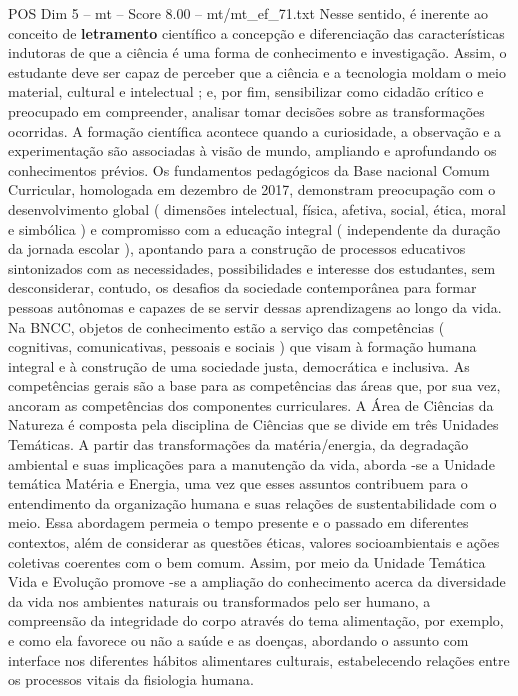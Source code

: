 \begin{textsample}{POS Dim 5 – mt – Score 8.00 – mt/mt\_ef\_71.txt}
Nesse sentido, é inerente ao conceito de \textbf{letramento} científico a concepção e diferenciação das características indutoras de que a ciência é uma forma de conhecimento e investigação.
Assim, o estudante deve ser capaz de perceber que a ciência e a tecnologia moldam o meio material, cultural e intelectual ; e, por fim, sensibilizar como cidadão crítico e preocupado em compreender, analisar tomar decisões sobre as transformações ocorridas.
A formação científica acontece quando a curiosidade, a observação e a experimentação são associadas à visão de mundo, ampliando e aprofundando os conhecimentos prévios.
Os fundamentos pedagógicos da Base nacional Comum Curricular, homologada em dezembro de 2017, demonstram preocupação com o desenvolvimento global ( dimensões intelectual, física, afetiva, social, ética, moral e simbólica ) e compromisso com a educação integral ( independente da duração da jornada escolar ), apontando para a construção de processos educativos sintonizados com as necessidades, possibilidades e interesse dos estudantes, sem desconsiderar, contudo, os desafios da sociedade contemporânea para formar pessoas autônomas e capazes de se servir dessas aprendizagens ao longo da vida.
Na BNCC, objetos de conhecimento estão a serviço das competências ( cognitivas, comunicativas, pessoais e sociais ) que visam à formação humana integral e à construção de uma sociedade justa, democrática e inclusiva.
As competências gerais são a base para as competências das áreas que, por sua vez, ancoram as competências dos componentes curriculares.
A Área de Ciências da Natureza é composta pela disciplina de Ciências que se divide em três Unidades Temáticas.
A partir das transformações da matéria/energia, da degradação ambiental e suas implicações para a manutenção da vida, aborda -se a Unidade temática Matéria e Energia, uma vez que esses assuntos contribuem para o entendimento da organização humana e suas relações de sustentabilidade com o meio.
Essa abordagem permeia o tempo presente e o passado em diferentes contextos, além de considerar as questões éticas, valores socioambientais e ações coletivas coerentes com o bem comum.
Assim, por meio da Unidade Temática Vida e Evolução promove -se a ampliação do conhecimento acerca da diversidade da vida nos ambientes naturais ou transformados pelo ser humano, a compreensão da integridade do corpo através do tema alimentação, por exemplo, e como ela favorece ou não a saúde e as doenças, abordando o assunto com interface nos diferentes hábitos alimentares culturais, estabelecendo relações entre os processos vitais da fisiologia humana.

\end{textsample}
